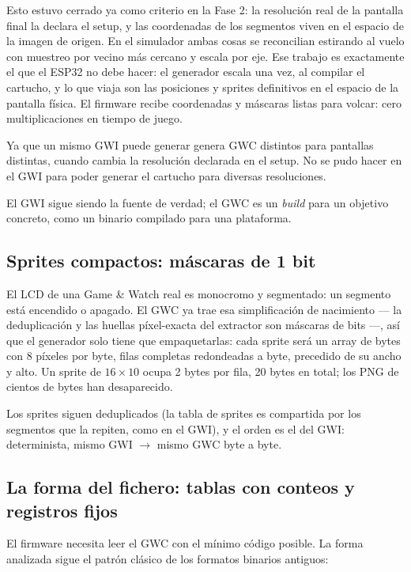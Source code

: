 Esto estuvo cerrado ya como criterio en la Fase 2: la resolución real de la pantalla final la declara el setup, y las coordenadas de los segmentos viven en el espacio de la imagen de
origen. En el simulador ambas cosas se reconcilian estirando al vuelo
con muestreo por vecino más cercano y escala por eje. Ese trabajo es
exactamente el que el ESP32 no debe hacer: el generador escala una
vez, al compilar el cartucho, y lo que viaja son las posiciones y
sprites definitivos en el espacio de la pantalla física. El firmware
recibe coordenadas y máscaras listas para volcar: cero multiplicaciones
en tiempo de juego.

Ya que un mismo GWI puede generar genera GWC distintos para
pantallas distintas, cuando cambia la resolución declarada en el setup. No se pudo hacer en el GWI para poder generar el cartucho para diversas resoluciones.

El GWI sigue siendo la fuente de verdad; el GWC es un \emph{build} para un objetivo concreto, como un binario compilado para una plataforma.

\subsection{Sprites compactos: máscaras de 1 bit}
\label{sec:F5Sprites}

El LCD de una Game \& Watch real es monocromo y segmentado: un
segmento está encendido o apagado. El GWC ya trae esa simplificación
de nacimiento — la deduplicación y las huellas píxel-exacta del
extractor son máscaras de bits —, así que el generador solo tiene que
empaquetarlas: cada sprite será un array de bytes con 8 píxeles por
byte, filas completas redondeadas a byte, precedido de su ancho y
alto. Un sprite de $16 \times 10$ ocupa 2 bytes por fila, 20 bytes en
total; los PNG de cientos de bytes han desaparecido.

Los sprites siguen deduplicados (la tabla de sprites es compartida
por los segmentos que la repiten, como en el GWI), y el orden es el
del GWI: determinista, mismo GWI $\rightarrow$ mismo GWC byte a
byte.

\subsection{La forma del fichero: tablas con conteos y registros fijos}
\label{sec:F5Forma}

El firmware necesita leer el GWC con el mínimo código posible. La
forma analizada sigue el patrón clásico de los formatos binarios
antiguos:

